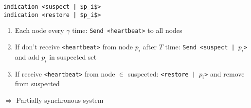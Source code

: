 \begin{lstlisting}[caption={Eventually Perfect detector}, mathescape, captionpos=b]
indication <suspect | $p_i$>
indication <restore | $p_i$>
\end{lstlisting}

\begin{enumerate}
    \item Each node every $\gamma$ time: \texttt{Send <heartbeat>} to all nodes
    \item If don't receive \texttt{<heartbeat>} from node $p_i$ after $T$ time:
    \texttt{Send <suspect | $p_i$>} and add $p_i$ in suspected set
    \item If receive \texttt{<heartbeat>} from node $\in$ suspected:
    \texttt{<restore | $p_i$>} and remove from suspected
\end{enumerate}

$\Rightarrow$ Partially synchronous system
